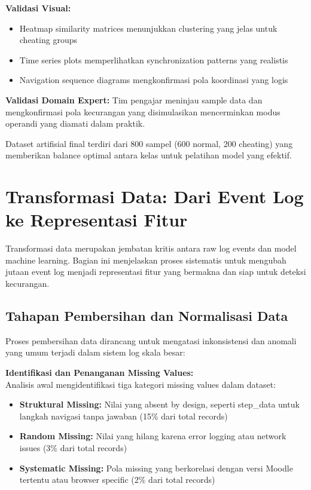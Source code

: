 \textbf{Validasi Visual:}
\begin{itemize}
    \item Heatmap similarity matrices menunjukkan clustering yang jelas untuk cheating groups
    \item Time series plots memperlihatkan synchronization patterns yang realistis
    \item Navigation sequence diagrams mengkonfirmasi pola koordinasi yang logis
\end{itemize}

\textbf{Validasi Domain Expert:}
Tim pengajar meninjau sample data dan mengkonfirmasi pola kecurangan yang disimulasikan mencerminkan modus operandi yang diamati dalam praktik.

Dataset artifisial final terdiri dari 800 sampel (600 normal, 200 cheating) yang memberikan balance optimal antara kelas untuk pelatihan model yang efektif.

\section{Transformasi Data: Dari Event Log ke Representasi Fitur}
\label{sec:transformasiData}

Transformasi data merupakan jembatan kritis antara raw log events dan model machine learning. Bagian ini menjelaskan proses sistematis untuk mengubah jutaan event log menjadi representasi fitur yang bermakna dan siap untuk deteksi kecurangan.

\subsection{Tahapan Pembersihan dan Normalisasi Data}
\label{sec:pembersihanNormalisasi}

Proses pembersihan data dirancang untuk mengatasi inkonsistensi dan anomali yang umum terjadi dalam sistem log skala besar:

\textbf{Identifikasi dan Penanganan Missing Values:} \\
Analisis awal mengidentifikasi tiga kategori missing values dalam dataset:
\begin{itemize}
    \item \textbf{Struktural Missing:} Nilai yang absent by design, seperti step\_data untuk langkah navigasi tanpa jawaban (15\% dari total records)
    \item \textbf{Random Missing:} Nilai yang hilang karena error logging atau network issues (3\% dari total records)
    \item \textbf{Systematic Missing:} Pola missing yang berkorelasi dengan versi Moodle tertentu atau browser specific (2\% dari total records)
\end{itemize}

